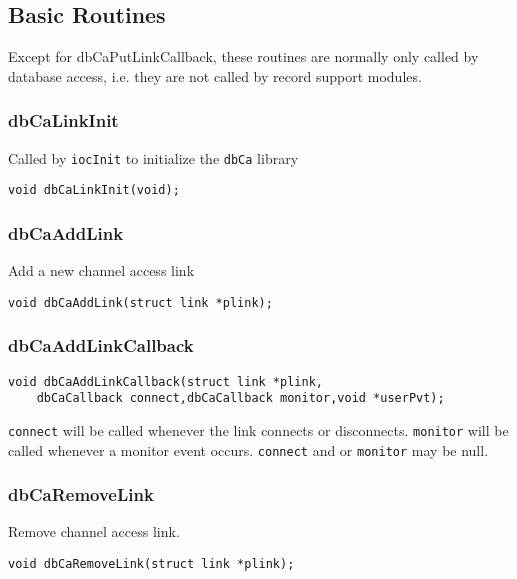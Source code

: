 \subsection{Basic Routines}

Except for dbCaPutLinkCallback, these routines are normally only called by database access, i.e. they are not called by 
record support modules.

\subsubsection{dbCaLinkInit}

Called by \verb|iocInit| to initialize the \verb|dbCa| library

\begin{verbatim}
void dbCaLinkInit(void);
\end{verbatim}

\subsubsection{dbCaAddLink}

Add a new channel access link

\begin{verbatim}
void dbCaAddLink(struct link *plink);
\end{verbatim}

\subsubsection{dbCaAddLinkCallback}

\begin{verbatim}
void dbCaAddLinkCallback(struct link *plink,
    dbCaCallback connect,dbCaCallback monitor,void *userPvt);
\end{verbatim}

\verb|connect| will be called whenever the link connects or disconnects. \verb|monitor| will be called whenever a monitor event 
occurs. \verb|connect| and or \verb|monitor| may be null.

\subsubsection{dbCaRemoveLink}

Remove channel access link.

\begin{verbatim}
void dbCaRemoveLink(struct link *plink);
\end{verbatim}


